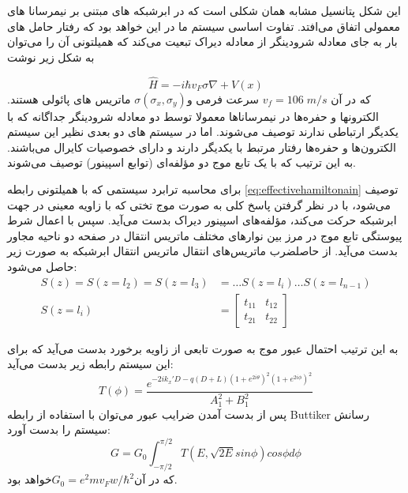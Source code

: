 این شکل پتانسیل مشابه همان شکلی است که در ابرشبکه های مبتنی بر نیمرسانا های معمولی اتفاق می‌افتد. تفاوت اساسی سیستم ما در این خواهد بود که رفتار حامل های بار به جای معادله شرودینگر از معادله دیراک تبعیت می‌کند که همیلتونی آن را می‌توان به شکل زیر نوشت

\begin{equation}
	\hat{H} = -i\hbar v_F\sigma \nabla + V(x)
    \label{eq:effectivehamiltonain}
\end{equation}
که در آن $v_f = 106 \; m/s$ سرعت فرمی و$\sigma(\sigma_x,\sigma_y)$ ماتریس های پائولی هستند. الکترونها و حفره‌ها در نیمرساناها معمولا توسط دو معادله شرودینگر جداگانه که با یکدیگر ارتباطی ندارند توصیف می‌شوند. اما در سیستم های دو بعدی نظیر این سیستم الکترون‌ها و حفره‌ها رفتار مرتبط با یکدیگر دارند و دارای خصوصیات کایرال می‌باشند. به این ترتیب که با یک تابع موج دو مؤلفه‌ای (توابع اسپینور) توصیف می‌شوند.

برای محاسبه ترابرد سیستمی که با همیلتونی رابطه \ref{eq:effectivehamiltonain} توصیف می‌شود، با در نظر گرفتن پاسخ کلی به صورت موج تختی که با زاویه معینی در جهت ابرشبکه حرکت می‌کند، مؤلفه‌های اسپینور دیراک بدست می‌آید. سپس با اعمال شرط پیوستگی تابع موج در مرز بین نوارهای مختلف ماتریس انتقال در صفحه دو ناحیه مجاور بدست می‌آید. از حاصلضرب ماتریس‌های انتقال ماتریس انتقال ابرشبکه به صورت زیر حاصل می‌شود:
\begin{equation}
    \begin{split}
    S(z) = S(z=l_{2}) = S(z=l_{3}) &= \dots S(z=l_{i})       \dots S(z=l_{n-1})\\
    S(z=l_{i}) &= 
        \begin{bmatrix} 
            t_{11} & t_{12} \\
            t_{21} & t_{22}
        \end{bmatrix}
    \end{split}
\end{equation}

به این ترتیب احتمال عبور موج به صورت تابعی از زاویه برخورد بدست می‌آید که برای این سیستم رابطه زیر بدست می‌آید:
\begin{equation}
    T(\phi) = \frac{e^{-2ik_x\prime D-q(D+L)(1+e^{2i\theta})^2(1+e^{2i\phi})^2}}{A_1^2 + B_1^2}
\end{equation}
پس از  بدست آمدن ضرایب عبور می‌توان با استفاده از رابطه \gls{Buttiker} رسانش سیستم را بدست آورد:
\begin{equation}
    G = G_0 \int_{-\pi/2}^{\pi/2} T(E,\sqrt{2E} sin\phi)cos\phi d\phi
\end{equation}
که در آن$G_0 = e^2m v_F w/\hbar^2$خواهد بود.

